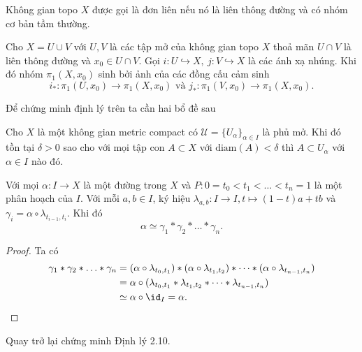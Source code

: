 \begin{definition}
    Không gian topo $X$ được gọi là đơn liên nếu nó là liên thông đường và có nhóm cơ bản tầm thường.
\end{definition}
\begin{theorem}
    Cho $X=U\cup V$ với $U,V$ là các tập mở của không gian topo $X$ thoả mãn $U\cap V$ là liên thông đường và $x_0\in U\cap V$. Gọi $i:U\hookrightarrow X,~j:V\hookrightarrow X$ là các ánh xạ nhúng. Khi đó nhóm $\pi_1(X,x_0)$ sinh bởi ảnh của các đồng cấu cảm sinh 
    \[i_*:\pi_1(U,x_0)\to \pi_1(X,x_0)\text{ và } j_*:\pi_1(V,x_0)\to \pi_1(X,x_0).\]
\end{theorem}
Để chứng minh định lý trên ta cần hai bổ đề sau
\begin{lemma}
    Cho $ X $ là một không gian metric compact có $\mathcal{U} = \{U_\alpha\}_{\alpha\in I}$ là phủ mở. Khi đó tồn tại $\delta > 0$ sao cho với mọi tập con $ A \subset X $ với $\text{diam}(A) < \delta$ thì $ A \subset U_\alpha $  với $\alpha\in I$ nào đó.
\end{lemma}
\begin{lemma}
    Với mọi $\alpha:I\to X$ là một đường trong $X$ và  $P:0=t_0<t_1<\ldots<t_n=1$ là một phân hoạch của $I$. Với mỗi $a,b\in I$, ký hiệu $\lambda_{a,b}:I\to I, t\mapsto (1-t)a+tb$ và $\gamma_i = \alpha\circ \lambda_{t_{i-1},t_i}$. Khi đó \[\alpha\simeq\gamma_1*\gamma_2*\ldots*\gamma_n.\]
\end{lemma}
\begin{proof}
    Ta có 
    \begin{align*}
        \gamma_1*\gamma_2*\ldots*\gamma_n 
        &= (\alpha \circ \lambda_{t_0,t_1})*(\alpha \circ \lambda_{t_1,t_2})*\cdots*(\alpha \circ \lambda_{t_{n-1},t_n})\\
        &= \alpha \circ (\lambda_{t_0,t_1}*\lambda_{t_1,t_2}*\cdots*\lambda_{t_{n-1},t_n})\\
        &\simeq \alpha\circ \id_I = \alpha.
    \end{align*}
\end{proof}
Quay trở lại chứng minh Định lý 2.10.
